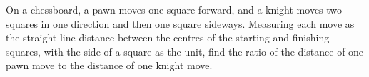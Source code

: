 On a chessboard, a pawn moves one square forward, and a knight moves two squares in one direction and then one square sideways. Measuring each move as the straight-line distance between the centres of the starting and finishing squares, with the side of a square as the unit, find the ratio of the distance of one pawn move to the distance of one knight move.
